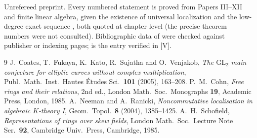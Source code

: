 \documentclass[11pt]{amsart}
\numberwithin{equation}{section}
\theoremstyle{definition}
\theoremstyle{remark}
\begin{document}
Unrefereed preprint. Every numbered statement is proved from Papers III--XII and finite
linear algebra, given the existence of universal localization \cite{Co} and the low-degree
exact sequence \cite[Ch.~4]{Sch}, both quoted at chapter level (the precise theorem numbers
were not consulted). Bibliographic data of \cite{Co,Sch,NR} were checked against publisher
or indexing pages; \cite{CFKSV} is the entry verified in [V].

\begin{thebibliography}{9}
 J.~Coates, T.~Fukaya, K.~Kato, R.~Sujatha and O.~Venjakob, \emph{The
$\mathrm{GL}_2$ main conjecture for elliptic curves without complex multiplication},
Publ.\ Math.\ Inst.\ Hautes \'Etudes Sci.\ \textbf{101} (2005), 163--208.
 P.~M.~Cohn, \emph{Free rings and their relations}, 2nd ed., London Math.\ Soc.\
Monographs \textbf{19}, Academic Press, London, 1985.
 A.~Neeman and A.~Ranicki, \emph{Noncommutative localisation in algebraic
$K$-theory I}, Geom.\ Topol.\ \textbf{8} (2004), 1385--1425.
 A.~H.~Schofield, \emph{Representations of rings over skew fields}, London Math.\
Soc.\ Lecture Note Ser.\ \textbf{92}, Cambridge Univ.\ Press, Cambridge, 1985.
\end{thebibliography}
\end{document}
